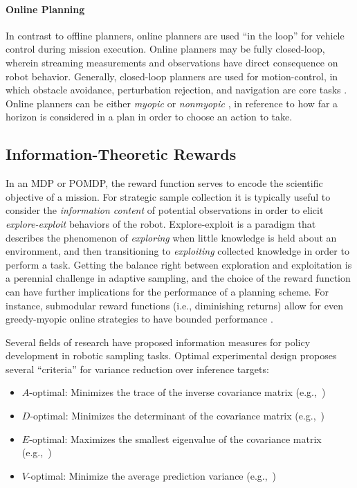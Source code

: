 \paragraph{Online Planning}
In contrast to offline planners, online planners are used ``in the loop'' for vehicle control during mission execution.
Online planners may be fully closed-loop, wherein streaming measurements and observations have direct consequence on robot behavior.
Generally, closed-loop planners are used for motion-control, in which obstacle avoidance, perturbation rejection, and navigation are core tasks \autocite{majumdar2013robust,esposito2002method}.
Online planners can be either \emph{myopic} \autocite{vergassola2007infotaxis,edwards2005moth} or \emph{nonmyopic} \autocite{Arora2017,singh2009nonmyopic,Lim2016,meliou2007nonmyopic,kurniawati2008sarsop,somani2013despot,sunberg2018online,browne2012survey}, in reference to how far a horizon is considered in a plan in order to choose an action to take.

\subsection{Information-Theoretic Rewards}
In an MDP or POMDP, the reward function serves to encode the scientific objective of a mission. For strategic sample collection it is typically useful to consider the \emph{information content} of potential observations in order to elicit \emph{explore-exploit} behaviors of the robot. Explore-exploit is a paradigm that describes the phenomenon of \emph{exploring} when little knowledge is held about an environment, and then transitioning to \emph{exploiting} collected knowledge in order to perform a task. Getting the balance right between exploration and exploitation is a perennial challenge in adaptive sampling, and the choice of the reward function can have further implications for the performance of a planning scheme. For instance, submodular reward functions (i.e., diminishing returns) allow for even greedy-myopic online strategies to have bounded performance \autocite{horel2016notes}. 

Several fields of research have proposed information measures for policy development in robotic sampling tasks. Optimal experimental design \autocite{fedorov2013theory} proposes several ``criteria'' for variance reduction over inference targets:

\begin{itemize}
	\item $A$-optimal: Minimizes the trace of the inverse covariance matrix (e.g.,~\cite{sim2005global,kollar2008trajectory,carrillo2015monotonicity})
	\item $D$-optimal: Minimizes the determinant of the covariance matrix (e.g.,~\cite{kollar2008trajectory,carrillo2015monotonicity,joshi2008sensor,joshi2008sensor})
	\item $E$-optimal: Maximizes the smallest eigenvalue of the covariance matrix (e.g.,~\cite{carrillo2015monotonicity})
	\item $V$-optimal: Minimize the average prediction variance (e.g.,~\cite{cohn1994neural})
\end{itemize}

